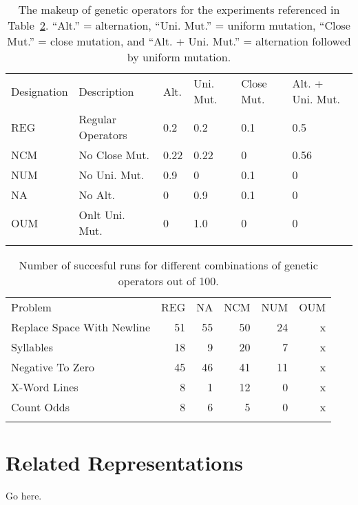 \begin{table}
\centering
\caption{The makeup of genetic operators for the experiments referenced in
Table~\ref{genetic-operator-results}.
``Alt.'' = alternation,
``Uni. Mut.'' = uniform mutation,
``Close Mut.'' = close mutation, and
``Alt. + Uni. Mut.'' = alternation followed by uniform mutation.}
\label{genetic-operator-combinations}
\begin{tabular}{ll llll}
\hline\noalign{\smallskip}
Designation & Description & Alt. & Uni. Mut. & Close Mut. & Alt. + Uni. Mut. \\
\noalign{\smallskip}\svhline\noalign{\smallskip}
REG & Regular Operators &  0.2 &  0.2 &  0.1 &  0.5  \\
NCM & No Close Mut.  &  0.22 &  0.22 &  0 &  0.56  \\
NUM & No Uni. Mut. &  0.9 &  0 &  0.1 &  0  \\
NA  & No Alt. &  0 &  0.9 &  0.1 &  0  \\
OUM & Onlt Uni. Mut. &  0 &  1.0 &  0 &  0  \\
\noalign{\smallskip}\hline\noalign{\smallskip}
\end{tabular}
\end{table}


\begin{table}
\centering
\label{genetic-operator-results}
\caption{Number of succesful runs for different combinations of genetic
operators out of 100.}
\begin{tabular}{l r r r r r}
\hline\noalign{\smallskip}
Problem                    & REG & NA & NCM & NUM & OUM \\
\noalign{\smallskip}\svhline\noalign{\smallskip}
Replace Space With Newline &  51 & 55 &  50 &  24 &   x \\
Syllables                  &  18 &  9 &  20 &   7 &   x \\
Negative To Zero           &  45 & 46 &  41 &  11 &   x \\
X-Word Lines               &   8 &  1 &  12 &   0 &   x \\
Count Odds                 &   8 &  6 &   5 &   0 &   x \\
\noalign{\smallskip}\hline\noalign{\smallskip}
\end{tabular}
\end{table}



\section{Related Representations}







\begin{acknowledgement}
Go here.
\end{acknowledgement}
%




